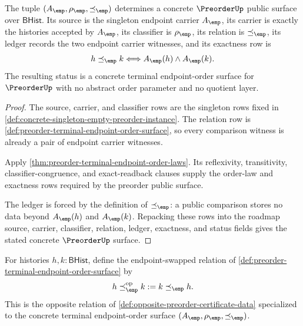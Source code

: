 \begin{theorem}
\label{thm:preorder-terminal-endpoint-order-public-certificate}
The tuple $(A_{\emp},\rho_{\emp},\preceq_{\emp})$ determines a concrete
$\PreorderUp$ public surface over $\mathsf{BHist}$. Its source is the
singleton endpoint carrier $A_{\emp}$, its carrier is exactly the histories
accepted by $A_{\emp}$, its classifier is $\rho_{\emp}$, its relation is
$\preceq_{\emp}$, its ledger records the two endpoint carrier witnesses, and
its exactness row is
$$
h\preceq_{\emp}k
\Longleftrightarrow
A_{\emp}(h)\land A_{\emp}(k).
$$
The resulting status is a concrete terminal endpoint-order surface for
$\PreorderUp$ with no abstract order parameter and no quotient layer.
\end{theorem}
\begin{proof}
The source, carrier, and classifier rows are the singleton rows fixed in
\autoref{def:concrete-singleton-empty-preorder-instance}. The relation row is
\autoref{def:preorder-terminal-endpoint-order-surface}, so every comparison
witness is already a pair of endpoint carrier witnesses.

Apply \autoref{thm:preorder-terminal-endpoint-order-laws}. Its reflexivity,
transitivity, classifier-congruence, and exact-readback clauses supply the
order-law and exactness rows required by the preorder public surface.

The ledger is forced by the definition of $\preceq_{\emp}$: a public
comparison stores no data beyond $A_{\emp}(h)$ and $A_{\emp}(k)$. Repacking
these rows into the roadmap source, carrier, classifier, relation, ledger,
exactness, and status fields gives the stated concrete $\PreorderUp$ surface.
\end{proof}

\begin{definition}
\label{def:preorder-terminal-opposite-endpoint-order}
For histories $h,k:\mathsf{BHist}$, define the endpoint-swapped relation of
\autoref{def:preorder-terminal-endpoint-order-surface} by
$$
h\preceq_{\emp}^{\mathrm{op}} k:=k\preceq_{\emp} h.
$$
This is the opposite relation of \autoref{def:opposite-preorder-certificate-data}
specialized to the concrete terminal endpoint-order surface
$(A_{\emp},\rho_{\emp},\preceq_{\emp})$.
\end{definition}

